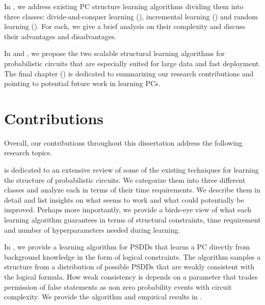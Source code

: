 In , we address existing PC structure learning algorithms dividing them into
three classes: divide-and-conquer learning (), incremental learning
() and random learning (). For each, we give a brief
analysis on their complexity and discuss their advantages and disadvantages.

In  and , we propose the two scalable structural learning algorithms
for probabilistic circuits that are especially suited for large data and fast deployment.  The
final chapter () is dedicated to summarizing our research contributions and
pointing to potential future work in learning PCs.

\section{Contributions}

Overall, our contributions throughout this dissertation address the following research topics.


 is dedicated to an extensive review of some of the existing techniques for
learning the structure of probabilistic circuits. We categorize them into three different classes
and analyze each in terms of their time requirements. We describe them in detail and list insights
on what seems to work and what could potentially be improved. Perhaps more importantly, we provide
a birds-eye view of what each learning algorithm guarantees in terms of structural constraints,
time requirement and number of hyperparameters needed during learning.


In \citet{geh21a}, we provide a learning algorithm for PSDDs that learns a PC directly from
background knowledge in the form of logical constraints. The algorithm samples a structure from a
distribution of possible PSDDs that are weakly consistent with the logical formula. How weak
consistency is depends on a parameter that trades permission of false statements as non zero
probability events with circuit complexity. We provide the algorithm and empirical results in
.


